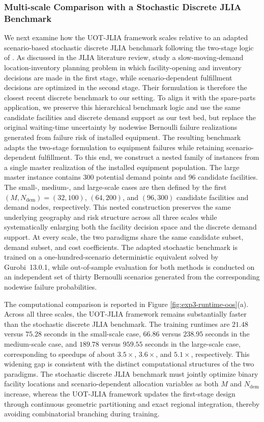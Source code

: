 \documentclass[a4paper,fleqn]{cas-sc}
\theoremstyle{remark}
\theoremstyle{plain}
\begin{document}
\subsubsection*{Multi-scale Comparison with a Stochastic Discrete JLIA Benchmark}\label{subsubsec:benchmark-comparison}

We next examine how the UOT-JLIA framework scales relative to an adapted scenario-based stochastic discrete JLIA benchmark following the two-stage logic of \cite{chu2025integrated}. As discussed in the JLIA literature review, \citeauthor{chu2025integrated} study a slow-moving-demand location-inventory planning problem in which facility-opening and inventory decisions are made in the first stage, while scenario-dependent fulfillment decisions are optimized in the second stage. Their formulation is therefore the closest recent discrete benchmark to our setting. To align it with the spare-parts application, we preserve this hierarchical benchmark logic and use the same candidate facilities and discrete demand support as our test bed, but replace the original waiting-time uncertainty by nodewise Bernoulli failure realizations generated from failure risk of installed equipment. The resulting benchmark adapts the two-stage formulation to equipment failures while retaining scenario-dependent fulfillment. To this end, we construct a nested family of instances from a single master realization of the installed equipment population. The large master instance contains 300 potential demand points and 96 candidate facilities. The small-, medium-, and large-scale cases are then defined by the first $(M, N_{\mathrm{dem}})=(32,100)$, $(64,200)$, and $(96,300)$ candidate facilities and demand nodes, respectively. This nested construction preserves the same underlying geography and risk structure across all three scales while systematically enlarging both the facility decision space and the discrete demand support. At every scale, the two paradigms share the same candidate subset, demand subset, and cost coefficients. The adapted stochastic benchmark is trained on a one-hundred-scenario deterministic equivalent solved by Gurobi~13.0.1, while out-of-sample evaluation for both methods is conducted on an independent set of thirty Bernoulli scenarios generated from the corresponding nodewise failure probabilities.

The computational comparison is reported in Figure \ref{fig:exp3-runtime-oos}(a). Across all three scales, the UOT-JLIA framework remains substantially faster than the stochastic discrete JLIA benchmark. The training runtimes are $21.48$ versus $75.28$ seconds in the small-scale case, $66.86$ versus $238.95$ seconds in the medium-scale case, and $189.78$ versus $959.55$ seconds in the large-scale case, corresponding to speedups of about $3.5\times$, $3.6\times$, and $5.1\times$, respectively. This widening gap is consistent with the distinct computational structures of the two paradigms. The stochastic discrete JLIA benchmark must jointly optimize binary facility locations and scenario-dependent allocation variables as both $M$ and $N_{\mathrm{dem}}$ increase, whereas the UOT-JLIA framework updates the first-stage design through continuous geometric partitioning and exact regional integration, thereby avoiding combinatorial branching during training.
\end{document}
